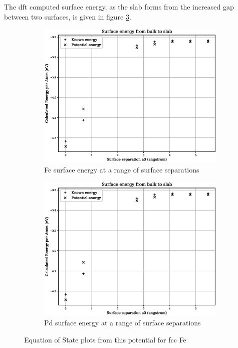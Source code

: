 The \acrshort{dft} computed surface energy, as the slab forms from the increased gap between two surfaces, is given in figure \ref{fig:fepd-energy-fitting}.

\begin{figure}[htb]
\centering
\begin{subfigure}{.47\textwidth}
  \centering
  \includegraphics[width=.94\linewidth]{chapters/potentials_fe_pd_ru/fepd_potential/fe_surface_energy.eps}  
  \caption{Fe surface energy at a range of surface separations}
  \label{fig:fepd-fefcc-rose}
\end{subfigure}
\begin{subfigure}{.47\textwidth}
  \centering
  \includegraphics[width=.94\linewidth]{chapters/potentials_fe_pd_ru/fepd_potential/pd_surface_energy.eps}  
  \caption{Pd surface energy at a range of surface separations}
  \label{fig:fepd-fefcc-bmeos}
\end{subfigure}
\caption{Equation of State plots from this potential for \acrshort{fcc} Fe}
\label{fig:fepd-energy-fitting}
\end{figure}











